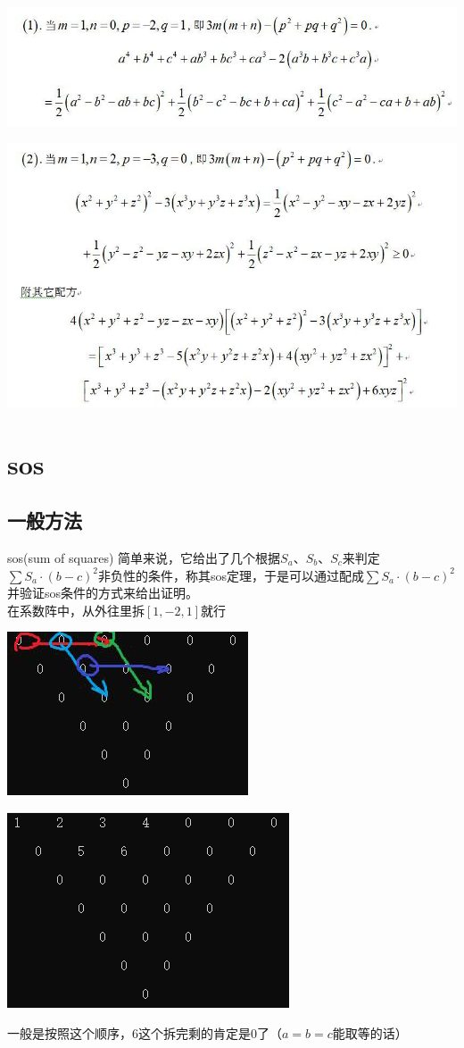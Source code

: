 \documentclass[UTF8]{ctexart}
\begin{document}
\begin{center}
	\includegraphics[width=0.8\linewidth]{b02}
\end{center}
\begin{center}
	\includegraphics[width=0.8\linewidth]{b03}
\end{center}
\section{sos}
\subsection{一般方法}
sos(sum of squares)
简单来说，它给出了几个根据$ S_{a} $、$ S_{b} $、$ S_{c} $来判定$ \displaystyle \sum S_{a}·(b-c)^{2} $非负性的条件，称其sos定理，于是可以通过配成$ \displaystyle \sum S_{a}·(b-c)^{2} $并验证sos条件的方式来给出证明。\\
在系数阵中，从外往里拆$ [1,-2,1] $就行
\begin{center}
	\includegraphics[width=0.4\linewidth]{37}
\end{center}
\begin{center}
	\includegraphics[width=0.4\linewidth]{45}
\end{center}
一般是按照这个顺序，$ 6 $这个拆完剩的肯定是$ 0 $了（$ a=b=c $能取等的话）
\end{document}
